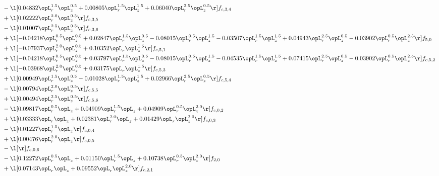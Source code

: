 \begin{alignat}{2}
& - \l[  0.04832 \opL_r^{1.5} \opL_z^{0.5} +  0.00805 \opL_r^{1.5} \opL_z^{1.5} +  0.06040 \opL_r^{2.5} \opL_z^{0.5}  \r] f_{c,3,4} \nonumber \\ 
& + \l[  0.02222 \opL_r^{2.0} \opL_z^{0.5}  \r] f_{c,3,5} \nonumber \\ 
& - \l[  0.01007 \opL_r^{2.5} \opL_z^{0.5}  \r] f_{c,3,6} \nonumber \\ 
& + \l[  -0.04218 \opL_r^{0.5} \opL_z^{0.5} +  0.02847 \opL_r^{1.5} \opL_z^{0.5}   -0.08015 \opL_r^{0.5} \opL_z^{1.5}   -0.03507 \opL_r^{1.5} \opL_z^{1.5} +  0.04943 \opL_r^{2.5} \opL_z^{0.5}   -0.03902 \opL_r^{0.5} \opL_z^{2.5}  \r] f_{5,0} \nonumber \\ 
& + \l[  -0.07937 \opL_r^{2.0} \opL_z^{0.5} +  0.10352 \opL_r \opL_z^{1.5}  \r] f_{c,5,1} \nonumber \\ 
& + \l[  -0.04218 \opL_r^{0.5} \opL_z^{0.5} +  0.03797 \opL_r^{1.5} \opL_z^{0.5}   -0.08015 \opL_r^{0.5} \opL_z^{1.5}   -0.04535 \opL_r^{1.5} \opL_z^{1.5} +  0.07415 \opL_r^{2.5} \opL_z^{0.5}   -0.03902 \opL_r^{0.5} \opL_z^{2.5}  \r] f_{c,5,2} \nonumber \\ 
& + \l[  -0.03968 \opL_r^{2.0} \opL_z^{0.5} +  0.03175 \opL_r \opL_z^{1.5}  \r] f_{c,5,3} \nonumber \\ 
& + \l[  0.00949 \opL_r^{1.5} \opL_z^{0.5}   -0.01028 \opL_r^{1.5} \opL_z^{1.5} +  0.02966 \opL_r^{2.5} \opL_z^{0.5}  \r] f_{c,5,4} \nonumber \\ 
& - \l[  0.00794 \opL_r^{2.0} \opL_z^{0.5}  \r] f_{c,5,5} \nonumber \\ 
& + \l[  0.00494 \opL_r^{2.5} \opL_z^{0.5}  \r] f_{c,5,6} \nonumber \\ 
& - \l[  0.09817 \opL_r^{0.5} \opL_z +  0.04909 \opL_r^{1.5} \opL_z +  0.04909 \opL_r^{0.5} \opL_z^{2.0}  \r] f_{c,0,2} \nonumber \\ 
& + \l[  0.03333 \opL_r \opL_z +  0.02381 \opL_r^{2.0} \opL_z +  0.01429 \opL_r \opL_z^{2.0}  \r] f_{c,0,3} \nonumber \\ 
& - \l[  0.01227 \opL_r^{1.5} \opL_z  \r] f_{c,0,4} \nonumber \\ 
& + \l[  0.00476 \opL_r^{2.0} \opL_z  \r] f_{c,0,5} \nonumber \\ 
& - \l[  \r] f_{c,0,6} \nonumber \\ 
& - \l[  0.12272 \opL_r^{0.5} \opL_z +  0.01150 \opL_r^{1.5} \opL_z +  0.10738 \opL_r^{0.5} \opL_z^{2.0}  \r] f_{2,0} \nonumber \\ 
& + \l[  0.07143 \opL_r \opL_z +  0.09552 \opL_r \opL_z^{2.0}  \r] f_{c,2,1} \nonumber \\ 

\end{alignat}
